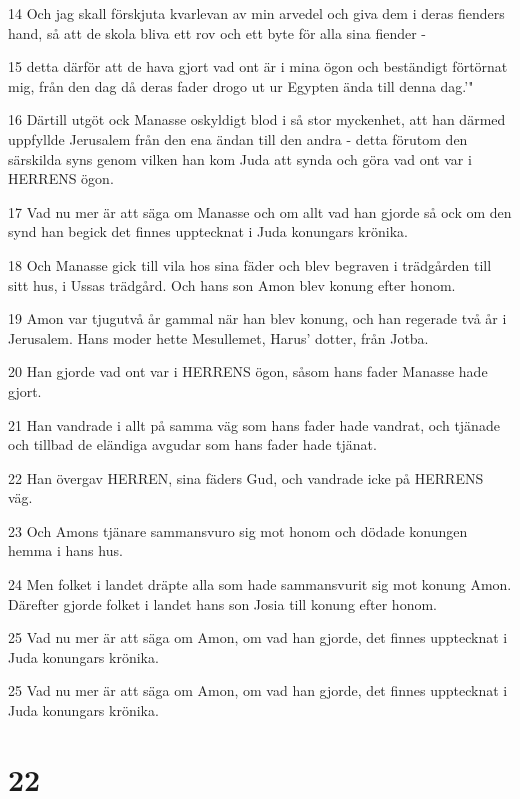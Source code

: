\par 14 Och jag skall förskjuta kvarlevan av min arvedel och giva dem i deras fienders hand, så att de skola bliva ett rov och ett byte för alla sina fiender -
\par 15 detta därför att de hava gjort vad ont är i mina ögon och beständigt förtörnat mig, från den dag då deras fader drogo ut ur Egypten ända till denna dag.'"
\par 16 Därtill utgöt ock Manasse oskyldigt blod i så stor myckenhet, att han därmed uppfyllde Jerusalem från den ena ändan till den andra - detta förutom den särskilda syns genom vilken han kom Juda att synda och göra vad ont var i HERRENS ögon.
\par 17 Vad nu mer är att säga om Manasse och om allt vad han gjorde så ock om den synd han begick det finnes upptecknat i Juda konungars krönika.
\par 18 Och Manasse gick till vila hos sina fäder och blev begraven i trädgården till sitt hus, i Ussas trädgård. Och hans son Amon blev konung efter honom.
\par 19 Amon var tjugutvå år gammal när han blev konung, och han regerade två år i Jerusalem. Hans moder hette Mesullemet, Harus' dotter, från Jotba.
\par 20 Han gjorde vad ont var i HERRENS ögon, såsom hans fader Manasse hade gjort.
\par 21 Han vandrade i allt på samma väg som hans fader hade vandrat, och tjänade och tillbad de eländiga avgudar som hans fader hade tjänat.
\par 22 Han övergav HERREN, sina fäders Gud, och vandrade icke på HERRENS väg.
\par 23 Och Amons tjänare sammansvuro sig mot honom och dödade konungen hemma i hans hus.
\par 24 Men folket i landet dräpte alla som hade sammansvurit sig mot konung Amon. Därefter gjorde folket i landet hans son Josia till konung efter honom.
\par 25 Vad nu mer är att säga om Amon, om vad han gjorde, det finnes upptecknat i Juda konungars krönika.
\par 25 Vad nu mer är att säga om Amon, om vad han gjorde, det finnes upptecknat i Juda konungars krönika.

\chapter{22}

